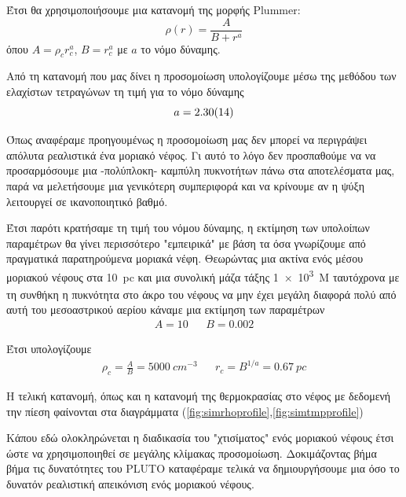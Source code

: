 Έτσι θα χρησιμοποιήσουμε μια κατανομή της μορφής Plummer:
\begin{equation}
\rho (r)=\frac{A}{B+r^a}
\end{equation}
όπου $A=\rho _c r_c^a$, $B=r_c^a$ με $a$ το νόμο δύναμης. 


Από τη κατανομή που μας δίνει η προσομοίωση υπολογίζουμε μέσω της μεθόδου των ελαχίστων τετραγώνων τη τιμή για το νόμο δύναμης
\begin{equation}
a=\num{2.3\pm 0.14}
\end{equation}

Όπως αναφέραμε προηγουμένως η προσομοίωση μας δεν μπορεί να περιγράψει απόλυτα ρεαλιστικά ένα μοριακό νέφος. Γι αυτό το λόγο δεν προσπαθούμε να να προσαρμόσουμε μια -πολύπλοκη- καμπύλη πυκνοτήτων πάνω στα αποτελέσματα μας, παρά να μελετήσουμε μια γενικότερη συμπεριφορά και να κρίνουμε αν η ψύξη λειτουργεί σε ικανοποιητικό βαθμό. 


Έτσι παρότι κρατήσαμε τη τιμή του νόμου δύναμης, η εκτίμηση των υπολοίπων παραμέτρων θα γίνει περισσότερο "εμπειρικά" με βάση τα όσα γνωρίζουμε από πραγματικά παρατηρούμενα μοριακά νέφη. Θεωρώντας μια ακτίνα ενός μέσου μοριακού νέφους στα \SI{10}{pc} και μια συνολική μάζα τάξης \SI{1e3}{M_\odot} ταυτόχρονα με τη συνθήκη η πυκνότητα στο άκρο του νέφους να μην έχει μεγάλη διαφορά πολύ από αυτή του μεσοαστρικού αερίου κάναμε μια εκτίμηση των παραμέτρων
\begin{align}
A=10 && B=0.002
\end{align}

Έτσι υπολογίζουμε
\begin{align}
\rho _c = \frac{A}{B}= \SI{5000}{cm^{-3}} && r_c = B^{1/a} = \SI{0.67}{pc}
\end{align}
 
Η τελική κατανομή, όπως και η κατανομή της θερμοκρασίας στο νέφος με δεδομενή την πίεση φαίνονται στα διαγράμματα (\ref{fig:simrhoprofile},\ref{fig:simtmpprofile})

Κάπου εδώ ολοκληρώνεται η διαδικασία του "χτισίματος" ενός μοριακού νέφους έτσι ώστε να χρησιμοποιηθεί σε μεγάλης κλίμακας προσομοίωση. Δοκιμάζοντας βήμα βήμα τις δυνατότητες του PLUTO καταφέραμε τελικά να δημιουργήσουμε μια όσο το δυνατόν ρεαλιστική απεικόνιση ενός μοριακού νέφους.  



























